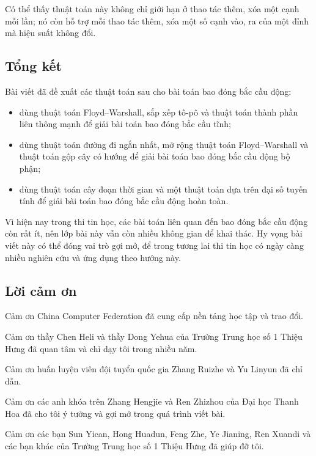 \documentclass[11pt]{article}
\begin{document}
Có thể thấy thuật toán này không chỉ giới hạn ở thao tác thêm, xóa một cạnh
mỗi lần; nó còn hỗ trợ mỗi thao tác thêm, xóa một số cạnh vào, ra của một đỉnh
mà hiệu suất không đổi.

\subsection{Tổng kết}

Bài viết đã đề xuất các thuật toán sau cho bài toán bao đóng bắc cầu động:
\begin{itemize}
  \item dùng thuật toán Floyd--Warshall, sắp xếp tô-pô và thuật toán thành phần
  liên thông mạnh để giải bài toán bao đóng bắc cầu tĩnh;

  \item dùng thuật toán đường đi ngắn nhất, mở rộng thuật toán Floyd--Warshall
  và thuật toán gộp cây có hướng để giải bài toán bao đóng bắc cầu động bộ
  phận;

  \item dùng thuật toán cây đoạn thời gian và một thuật toán dựa trên đại số
  tuyến tính để giải bài toán bao đóng bắc cầu động hoàn toàn.
\end{itemize}

Vì hiện nay trong thi tin học, các bài toán liên quan đến bao đóng bắc cầu
động còn rất ít, nên lớp bài này vẫn còn nhiều không gian để khai thác. Hy
vọng bài viết này có thể đóng vai trò gợi mở, để trong tương lai thi tin học
có ngày càng nhiều nghiên cứu và ứng dụng theo hướng này.

\subsection*{Lời cảm ơn}

Cảm ơn China Computer Federation đã cung cấp nền tảng học tập và trao đổi.

Cảm ơn thầy Chen Heli và thầy Dong Yehua của Trường Trung học số 1 Thiệu Hưng
đã quan tâm và chỉ dạy tôi trong nhiều năm.

Cảm ơn huấn luyện viên đội tuyển quốc gia Zhang Ruizhe và Yu Linyun đã chỉ
dẫn.

Cảm ơn các anh khóa trên Zhang Hengjie và Ren Zhizhou của Đại học Thanh Hoa đã
cho tôi ý tưởng và gợi mở trong quá trình viết bài.

Cảm ơn các bạn Sun Yican, Hong Huadun, Feng Zhe, Ye Jianing, Ren Xuandi và các
bạn khác của Trường Trung học số 1 Thiệu Hưng đã giúp đỡ tôi.
\end{document}
